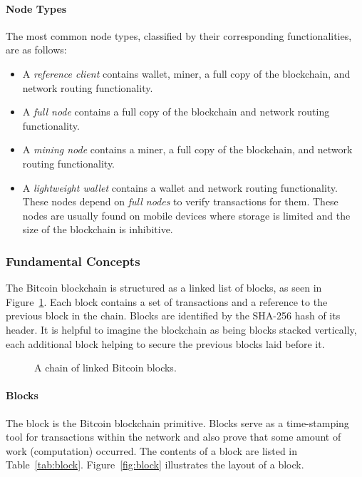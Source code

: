 \paragraph{Node Types} The most common node types, classified by their
corresponding functionalities, are as follows:\cite{mastering-bitcoin}
\begin{itemize}
    \item A \emph{reference client} contains wallet, miner, a full copy of the
        blockchain, and network routing functionality.
    \item A \emph{full node} contains a full copy of the blockchain and
        network routing functionality.
    \item A \emph{mining node} contains a miner, a full copy of the
        blockchain, and network routing functionality.
    \item A \emph{lightweight wallet} contains a wallet and network routing
        functionality. These nodes depend on \emph{full nodes} to verify
        transactions for them. These nodes are usually found on mobile devices
        where storage is limited and the size of the blockchain is inhibitive.
\end{itemize}

\subsubsection{Fundamental Concepts}
The Bitcoin blockchain is structured as a linked list of blocks, as seen in
Figure~\ref{fig:blockchain}. Each block contains a set of transactions and a
reference to the previous block in the chain. Blocks are identified by the
SHA-256 hash of its header. It is helpful to imagine the blockchain as being
blocks stacked vertically, each additional block helping to secure the previous
blocks laid before it.

\begin{figure}[H]
    \centering
    \caption{A chain of linked Bitcoin blocks.~\cite{bitcoin}}\label{fig:blockchain}
\end{figure}

\paragraph{Blocks}
The block is the Bitcoin blockchain primitive. Blocks serve as a time-stamping
tool for transactions within the network and also prove that some amount of work
(computation) occurred. The contents of a block are listed in
Table~\ref{tab:block}. Figure~\ref{fig:block} illustrates the layout of a block.

